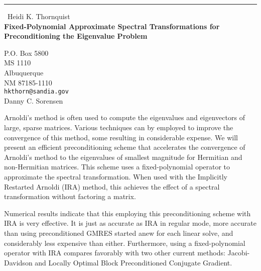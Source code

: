 \documentclass{report}
\begin{document}
\begin{center}
\rule{6in}{1pt} \
{\large Heidi K. Thornquist \\
{\bf Fixed-Polynomial Approximate Spectral Transformations for Preconditioning the Eigenvalue Problem}}

P.O. Box 5800 \\ MS 1110 \\ Albuquerque \\ NM  87185-1110
\\
{\tt hkthorn@sandia.gov}\\
Danny C. Sorensen\end{center}

Arnoldi's method is often used to compute the eigenvalues
and eigenvectors of large, sparse matrices. Various
techniques can by employed to improve the convergence of
this method, some resulting in considerable expense.
We will present an efficient preconditioning scheme that
accelerates the convergence of Arnoldi's method to the
eigenvalues of smallest magnitude for Hermitian and
non-Hermitian matrices. This scheme uses a fixed-polynomial
operator to approximate the spectral transformation.
When used with the Implicitly Restarted Arnoldi (IRA) method,
this achieves the effect of a spectral transformation without
factoring a matrix.

Numerical results indicate that this employing this
preconditioning scheme with IRA is very effective. It
is just as accurate as IRA in regular mode, more accurate
than using preconditioned GMRES started anew for each
linear solve, and considerably less expensive than either.
Furthermore, using a fixed-polynomial operator with IRA
compares favorably with two other current methods:
Jacobi-Davidson and Locally Optimal Block Preconditioned
Conjugate Gradient.
\end{document}
